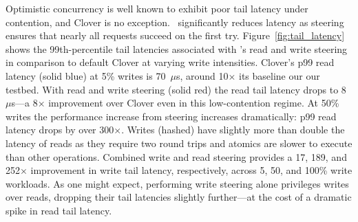 Optimistic concurrency is well known to exhibit poor tail latency under
contention, and Clover is no exception.  \sword\ significantly reduces latency
as steering ensures that nearly all requests succeed on the first try.
%
Figure~\ref{fig:tail_latency} shows the 99th-percentile tail latencies
associated with \sword's read and write steering in comparison to default Clover
at varying write intensities. Clover's p99 read latency (solid blue) at 5\%
writes is 70~$\mu$s, around 10$\times$ its baseline our our testbed. With read
and write steering (solid red) the read tail latency drops to 8~$\mu$s---a
8$\times$ improvement over Clover even in this low-contention regime. At 50\%
writes the performance increase from steering increases dramatically: p99 read latency drops by over 300$\times$.
%
%
Writes (hashed) have slightly more than double the latency of reads as they
require two round trips and atomics are slower to execute than other operations.
Combined write and read steering provides a 17, 189, and 252$\times$ improvement
in write tail latency, respectively, across 5, 50, and 100\% write workloads.
As one might expect, performing write steering alone privileges writes over
reads, dropping their tail latencies slightly further---at the cost of a
dramatic spike in read tail latency.


